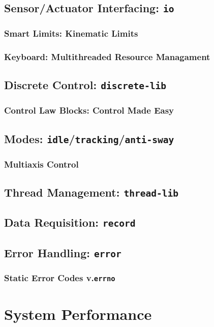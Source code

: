 \documentclass[letterpaper]{article}
\begin{document}
\newpage

\subsection{Sensor/Actuator Interfacing: \texttt{io}} \label{subsection-io}
\subsubsection{Smart Limits: Kinematic Limits}
\subsubsection{Keyboard: Multithreaded Resource Managament}
\subsection{Discrete Control: \texttt{discrete-lib}}
\subsubsection{Control Law Blocks: Control Made Easy}
\subsection{Modes: \texttt{idle}/\texttt{tracking}/\texttt{anti-sway}}
\subsubsection{Multiaxis Control}
\subsection{Thread Management: \texttt{thread-lib}}
\subsection{Data Requisition: \texttt{record}}
\subsection{Error Handling: \texttt{error}}
\subsubsection{Static Error Codes v.\texttt{errno}}

\newpage

\section{System Performance}
\end{document}
